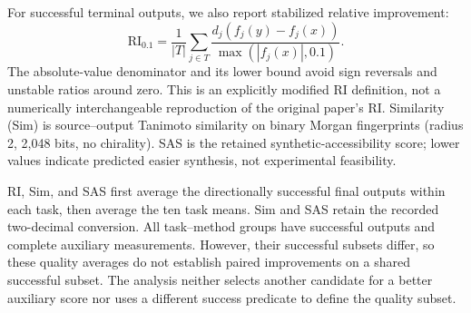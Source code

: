 For successful terminal outputs, we also report stabilized relative improvement:
\begin{equation}
 \mathrm{RI}_{0.1}=\frac{1}{|T|}\sum_{j\in T}
 \frac{d_j(f_j(y)-f_j(x))}{\max(|f_j(x)|,0.1)}.
\end{equation}
The absolute-value denominator and its lower bound avoid sign reversals and unstable ratios around zero. This is an explicitly modified RI definition, not a numerically interchangeable reproduction of the original paper's RI. Similarity (Sim) is source--output Tanimoto similarity on binary Morgan fingerprints (radius 2, 2,048 bits, no chirality). SAS is the retained synthetic-accessibility score; lower values indicate predicted easier synthesis, not experimental feasibility.

RI, Sim, and SAS first average the directionally successful final outputs within each task, then average the ten task means. Sim and SAS retain the recorded two-decimal conversion. All task--method groups have successful outputs and complete auxiliary measurements. However, their successful subsets differ, so these quality averages do not establish paired improvements on a shared successful subset. The analysis neither selects another candidate for a better auxiliary score nor uses a different success predicate to define the quality subset.

